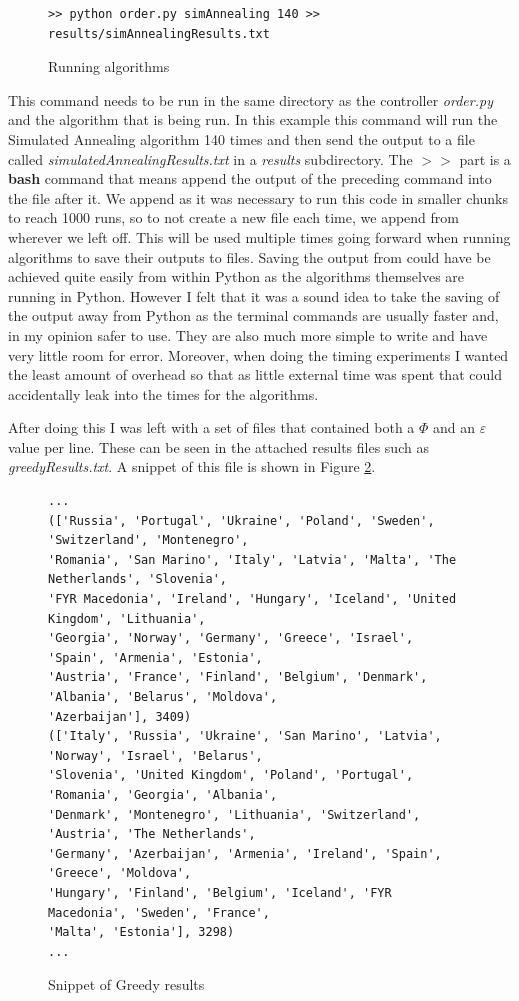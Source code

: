 \documentclass[12pt]{report}
\begin{document}
\begin{figure}[H]
\caption{Running algorithms}
\label{makeResults}
\begin{verbatim}
>> python order.py simAnnealing 140 >> results/simAnnealingResults.txt
\end{verbatim}
\end{figure}
This command needs to be run in the same directory as the controller \textit{order.py} and the algorithm that is being run. In this example this command will run the Simulated Annealing algorithm 140 times and then send the output to a file called \textit{simulatedAnnealingResults.txt} in a \textit{results} subdirectory. The $>>$ part is a \textbf{bash} command that means append the output of the preceding command into the file after it. We append as it was necessary to run this code in smaller chunks to reach 1000 runs, so to not create a new file each time, we append from wherever we left off. This will be used multiple times going forward when running algorithms to save their outputs to files. Saving the output from could have be achieved quite easily from within Python as the algorithms themselves are running in Python. However I felt that it was a sound idea to take the saving of the output away from Python as the terminal commands are usually faster and, in my opinion safer to use. They are also much more simple to write and have very little room for error. Moreover, when doing the timing experiments I wanted the least amount of overhead so that as little external time was spent that could accidentally leak into the times for the algorithms.

After doing this I was left with a set of files that contained both a $\Phi$ and an $\varepsilon$ value per line. These can be seen in the attached results files such as \textit{greedyResults.txt}. A snippet of this file is shown in Figure \ref{greedyResFile}.

\begin{figure}[H]
\caption{Snippet of Greedy results}
\label{greedyResFile}
\begin{verbatim}
...
(['Russia', 'Portugal', 'Ukraine', 'Poland', 'Sweden', 'Switzerland', 'Montenegro',
'Romania', 'San Marino', 'Italy', 'Latvia', 'Malta', 'The Netherlands', 'Slovenia', 
'FYR Macedonia', 'Ireland', 'Hungary', 'Iceland', 'United Kingdom', 'Lithuania', 
'Georgia', 'Norway', 'Germany', 'Greece', 'Israel', 'Spain', 'Armenia', 'Estonia', 
'Austria', 'France', 'Finland', 'Belgium', 'Denmark', 'Albania', 'Belarus', 'Moldova', 
'Azerbaijan'], 3409)
(['Italy', 'Russia', 'Ukraine', 'San Marino', 'Latvia', 'Norway', 'Israel', 'Belarus', 
'Slovenia', 'United Kingdom', 'Poland', 'Portugal', 'Romania', 'Georgia', 'Albania', 
'Denmark', 'Montenegro', 'Lithuania', 'Switzerland', 'Austria', 'The Netherlands', 
'Germany', 'Azerbaijan', 'Armenia', 'Ireland', 'Spain', 'Greece', 'Moldova', 
'Hungary', 'Finland', 'Belgium', 'Iceland', 'FYR Macedonia', 'Sweden', 'France', 
'Malta', 'Estonia'], 3298)
...
\end{verbatim}
\end{figure}
\end{document}
